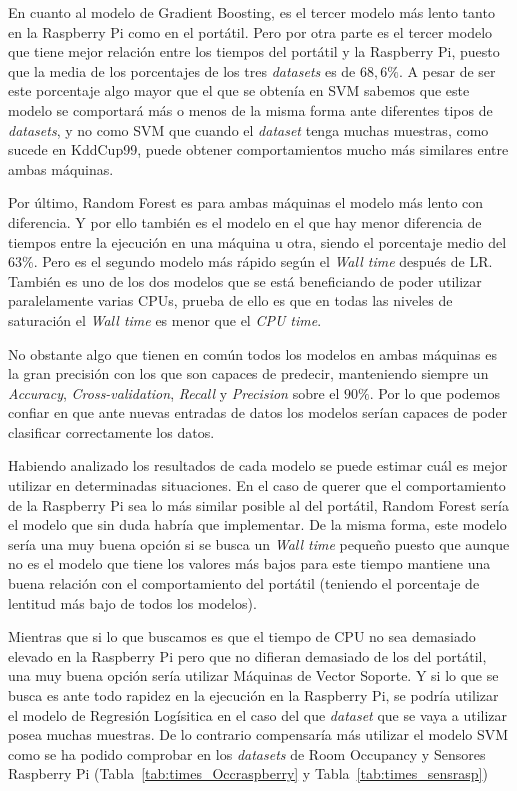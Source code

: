 \documentclass[a4paper, 12pt]{book}
\begin{document}
En cuanto al modelo de Gradient Boosting, es el tercer modelo más lento tanto en la Raspberry Pi como en el portátil. Pero por otra parte es el tercer modelo que tiene mejor relación entre los tiempos del portátil y la Raspberry Pi, puesto que la media de los porcentajes de los tres \textit{datasets} es de $68,6\%$. A pesar de ser este porcentaje algo mayor que el que se obtenía en SVM sabemos que este modelo se comportará más o menos de la misma forma ante diferentes tipos de \textit{datasets}, y no como SVM que cuando el \textit{dataset} tenga muchas muestras, como sucede en KddCup99, puede obtener comportamientos mucho más similares entre ambas máquinas.

Por último, Random Forest es para ambas máquinas el modelo más lento con diferencia. Y por ello también es el modelo en el que hay menor diferencia de tiempos entre la ejecución en una máquina u otra, siendo el porcentaje medio del $63\%$. Pero es el segundo modelo más rápido según el \textit{Wall time} después de LR. También es uno de los dos modelos que se está beneficiando de poder utilizar paralelamente varias CPUs, prueba de ello es que en todas las niveles de saturación el \textit{Wall time} es menor que el \textit{CPU time}.

No obstante algo que tienen en común todos los modelos en ambas máquinas es la gran precisión con los que son capaces de predecir, manteniendo siempre un \textit{Accuracy}, \textit{Cross-validation}, \textit{Recall} y \textit{Precision} sobre el $90\%$. Por lo que podemos confiar en que ante nuevas entradas de datos los modelos serían capaces de poder clasificar correctamente los datos.

Habiendo analizado los resultados de cada modelo se puede estimar cuál es mejor utilizar en determinadas situaciones. En el caso de querer que el comportamiento de la Raspberry Pi sea lo más similar posible al del portátil, Random Forest sería el modelo que sin duda habría que implementar. De la misma forma, este modelo sería una muy buena opción si se busca un \textit{Wall time} pequeño puesto que aunque no es el modelo que tiene los valores más bajos para este tiempo mantiene una buena relación con el comportamiento del portátil (teniendo el porcentaje de lentitud más bajo de todos los modelos).

Mientras que si lo que buscamos es que el tiempo de CPU no sea demasiado elevado en la Raspberry Pi pero que no difieran demasiado de los del portátil, una muy buena opción sería utilizar Máquinas de Vector Soporte.
Y si lo que se busca es ante todo rapidez en la ejecución en la Raspberry Pi, se podría utilizar el modelo de Regresión Logísitica en el caso del que \textit{dataset} que se vaya a utilizar posea muchas muestras. De lo contrario compensaría más utilizar el modelo SVM como se ha podido comprobar en los \textit{datasets} de Room Occupancy y Sensores Raspberry Pi (Tabla~\ref{tab:times_Occraspberry} y Tabla~\ref{tab:times_sensrasp})
 
\end{document}
